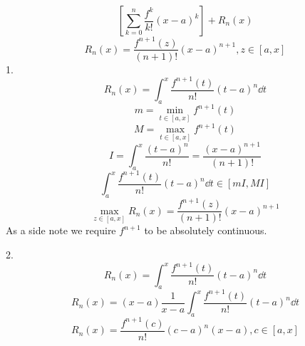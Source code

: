 \documentclass[11pt]{article}
\begin{document}
\newpage

$$\left[\sum_{k=0}^n\frac{f^{k}}{k!}(x-a)^k \right]+ R_n(x)$$
$$R_n(x) = \frac{f^{n+1}(z)}{(n+1)!}(x-a)^{n+1}, z\in[a,x]$$
1.
$$R_n(x) = \int_a^x \frac{f^{n+1}(t)}{n!}(t-a)^{n}\dd{t}$$
$$m = \min_{t\in[a,x]} f^{n+1}(t)$$
$$M = \max_{t\in[a,x]} f^{n+1}(t)$$
$$I = \int_a^x \frac{(t-a)^n}{n!} = \frac{(x-a)^{n+1}}{(n+1)!}$$
$$\int_a^x \frac{f^{n+1}(t)}{n!}(t-a)^{n}\dd{t} \in [mI,MI]$$
$$\max_{z\in[a,x]} R_n(x) = \frac{f^{n+1}(z)}{(n+1)!}(x-a)^{n+1}$$
As a side note we require $f^{n+1}$ to be absolutely continuous.

2.
$$R_n(x) = \int_a^x \frac{f^{n+1}(t)}{n!}(t-a)^{n}\dd{t}$$
$$R_n(x) = {(x-a)}\frac{1}{x-a}\int_a^x \frac{f^{n+1}(t)}{n!}(t-a)^{n}\dd{t}$$
$$R_n(x) = \frac{f^{n+1}(c)}{n!}(c-a)^n(x-a), {c\in[a,x]}$$
\end{document}
